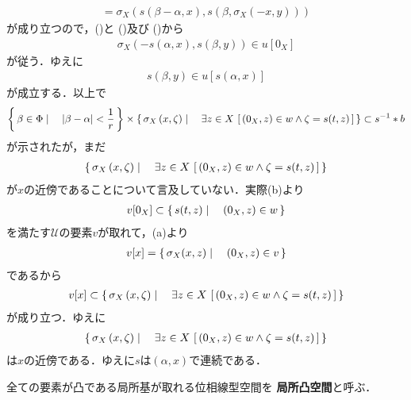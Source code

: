 \begin{sketch}
\begin{description}
\begin{align}
					= \sigma_X\left(s\left(\beta - \alpha,x\right),s\left(\beta,\sigma_X\left(-x,y\right)\right)\right)
				\end{align}
				が成り立つので，()と
				()及び
				()から
				\begin{align}
					\sigma_X\left(-s\left(\alpha,x\right), s\left(\beta,y\right)\right) \in u[0_X]
				\end{align}
				が従う．ゆえに
				\begin{align}
					s\left(\beta,y\right) \in u[s(\alpha,x)]
				\end{align}
				が成立する．以上で
				\begin{align}
					\left\{\, \beta \in \Phi \mid \quad |\beta - \alpha| < \frac{1}{r}\, \right\} \times
					\left\{\, \sigma_X\left(x,\zeta\right) \mid \quad \exists z \in X\, 
					\left[\, (0_X,z) \in w \wedge \zeta = s(t,z)\, \right]\, \right\}
					\subset s^{-1} \ast b
				\end{align}
				が示されたが，まだ
				\begin{align}
					\left\{\, \sigma_X\left(x,\zeta\right) \mid \quad \exists z \in X\, 
					\left[\, (0_X,z) \in w \wedge \zeta = s(t,z)\, \right]\, \right\}
				\end{align}
				が$x$の近傍であることについて言及していない．実際(b)より
				\begin{align}
					v[0_X] \subset \left\{\, s(t,z) \mid \quad (0_X,z) \in w\, \right\}
				\end{align}
				を満たす$\mathscr{U}$の要素$v$が取れて，(a)より
				\begin{align}
					v[x] = \left\{\, \sigma_X(x,z) \mid \quad (0_X,z) \in v\, \right\}
				\end{align}
				であるから
				\begin{align}
					v[x] \subset \left\{\, \sigma_X\left(x,\zeta\right) \mid \quad \exists z \in X\, 
					\left[\, (0_X,z) \in w \wedge \zeta = s(t,z)\, \right]\, \right\}
				\end{align}
				が成り立つ．ゆえに
				\begin{align}
					\left\{\, \sigma_X\left(x,\zeta\right) \mid \quad \exists z \in X\, 
					\left[\, (0_X,z) \in w \wedge \zeta = s(t,z)\, \right]\, \right\}
				\end{align}
				は$x$の近傍である．ゆえに$s$は$(\alpha,x)$で連続である．
				\QED
		\end{description}
	\end{sketch}
	
	\begin{screen}
		\begin{dfn}[局所凸空間]
			全ての要素が凸である局所基が取れる位相線型空間を
			{\bf 局所凸空間}と呼ぶ．
		\end{dfn}
	\end{screen}
	
